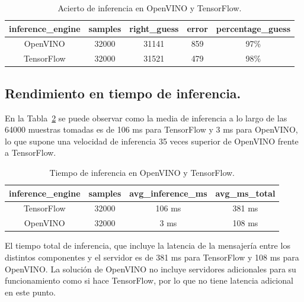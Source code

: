 \begin{table}[ht]
    \begin{center}
        \begin{tabular}{| c | c | c | c | c |}
            \hline
            inference\_engine & samples & right\_guess & error & percentage\_guess \\ \hline
            OpenVINO & 32000 & 31141 & 859 & 97\% \\
            TensorFlow & 32000 & 31521 & 479 & 98\% \\ \hline
        \end{tabular}
        \caption{Acierto de inferencia en OpenVINO y TensorFlow.}
        \label{tab:Comparativa de acierto de inferencia con OpenVINO y TensorFlow}
    \end{center}
\end{table}

\subsection{Rendimiento en tiempo de inferencia.}
En la Tabla~\ref{tab:Comparativa de tiempo de inferencia con OpenVINO y TensorFlow} se puede observar como la media de inferencia a lo largo de las 64000 muestras tomadas
es de 106 ms para TensorFlow y 3 ms para OpenVINO, lo que supone una velocidad de inferencia 35 veces superior de OpenVINO frente a TensorFlow.

\begin{table}[ht]
    \begin{center}
        \begin{tabular}{| c | c | c | c |}
            \hline
            inference\_engine & samples & avg\_inference\_ms & avg\_ms\_total \\ \hline
            TensorFlow & 32000 & 106 ms & 381 ms \\
            OpenVINO & 32000 & 3 ms & 108 ms \\ \hline
        \end{tabular}
        \caption{Tiempo de inferencia en OpenVINO y TensorFlow.}
        \label{tab:Comparativa de tiempo de inferencia con OpenVINO y TensorFlow}
    \end{center}
\end{table}

El tiempo total de inferencia, que incluye la latencia de la mensajería entre los distintos componentes y el servidor es de 381 ms para TensorFlow y 108 ms para OpenVINO. La solución de OpenVINO no incluye servidores adicionales para su funcionamiento como si hace TensorFlow, por lo que no tiene latencia adicional en este punto.


